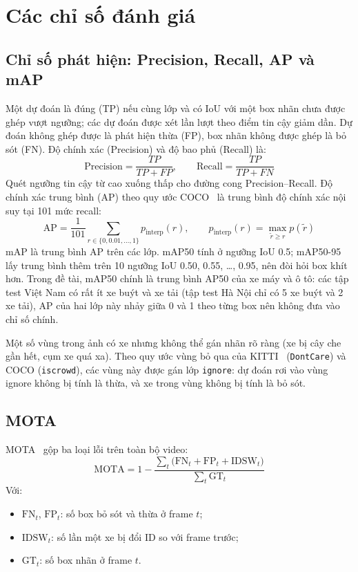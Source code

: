 \section{Các chỉ số đánh giá}
\label{sec:chi-so}

\subsection{Chỉ số phát hiện: Precision, Recall, AP và mAP}

Một dự đoán là đúng (TP) nếu cùng lớp và có IoU với một box nhãn chưa được ghép vượt ngưỡng; các dự đoán được xét lần
lượt theo điểm tin cậy giảm dần. Dự đoán không ghép được là phát hiện thừa (FP), box nhãn không được ghép là bỏ sót (FN). Độ chính xác (Precision) và độ bao phủ (Recall) là:
\begin{equation}
  \mathrm{Precision} = \frac{TP}{TP + FP}, \qquad \mathrm{Recall} = \frac{TP}{TP + FN}
  \label{eq:pr}
\end{equation}
Quét ngưỡng tin cậy từ cao xuống thấp cho đường cong Precision–Recall. Độ chính xác trung bình (AP) theo quy ước
COCO~\cite{lin2014coco} là trung bình độ chính xác nội suy tại 101 mức recall:
\begin{equation}
  \mathrm{AP} = \frac{1}{101} \sum_{r \in \{0, 0.01, \ldots, 1\}} p_{\mathrm{interp}}(r), \qquad
  p_{\mathrm{interp}}(r) = \max_{\tilde{r} \ge r} p(\tilde{r})
  \label{eq:ap}
\end{equation}
mAP là trung bình AP trên các lớp. mAP50 tính ở ngưỡng IoU 0.5; mAP50-95 lấy trung bình thêm trên 10 ngưỡng IoU 0.50,
0.55, \ldots, 0.95, nên đòi hỏi box khít hơn. Trong đề tài, mAP50 chính là trung bình AP50 của xe máy và ô tô:
các tập test Việt Nam có rất ít xe buýt và xe tải (tập test Hà Nội chỉ có 5 xe buýt và 2 xe tải), AP của hai lớp này
nhảy giữa 0 và 1 theo từng box nên không đưa vào chỉ số chính.

Một số vùng trong ảnh có xe nhưng không thể gán nhãn rõ ràng (xe bị cây che gần hết, cụm xe quá xa). Theo quy ước vùng
bỏ qua của KITTI~\cite{geiger2012kitti} (\texttt{DontCare}) và COCO (\texttt{iscrowd}), các vùng này được gán lớp
\texttt{ignore}: dự đoán rơi vào vùng ignore không bị tính là thừa, và xe trong vùng không bị tính là bỏ sót.

\subsection{MOTA}

MOTA~\cite{bernardin2008clear} gộp ba loại lỗi trên toàn bộ video:
\begin{equation}
  \mathrm{MOTA} = 1 - \frac{\sum_{t} \big( \mathrm{FN}_t + \mathrm{FP}_t + \mathrm{IDSW}_t \big)}{\sum_{t} \mathrm{GT}_t}
  \label{eq:mota}
\end{equation}
Với:
\begin{itemize}
  \item $\mathrm{FN}_t$, $\mathrm{FP}_t$: số box bỏ sót và thừa ở frame $t$;
  \item $\mathrm{IDSW}_t$: số lần một xe bị đổi ID so với frame trước;
  \item $\mathrm{GT}_t$: số box nhãn ở frame $t$.
\end{itemize}

